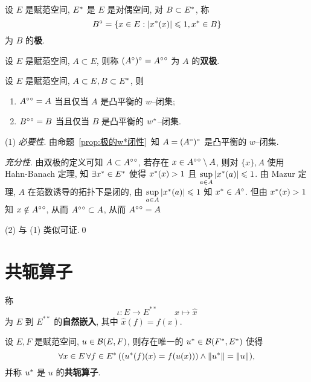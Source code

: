 	\begin{Definition}[对偶空间的极]\label{def:对偶空间的极}
		设 $ E $ 是赋范空间, $ E^{*} $ 是 $ E $ 是对偶空间, 对 $ B\subset E^{*} $, 称
		\[
			B^{\circ}=\{ x\in E:\left| x^{*}(x) \right| \leqslant1, x^{*}\in B \}
		\]
		为 $ B $ 的\textbf{极}.
	\end{Definition}
	\begin{Definition}[双极]\label{def:双极}
		设 $ E $ 是赋范空间, $ A\subset E $, 则称 $ (A^{\circ})^{\circ}=A^{\circ}{}^{\circ} $ 为 $ A $ 的\textbf{双极}.
	\end{Definition}

	\begin{Theorem}[双极定理]\label{thm:双极定理}
		设 $ E $ 是赋范空间, $ A\subset E, B\subset E^{*} $, 则
		\begin{enumerate}[(1)]
			\item $ A^{\circ}{}^{\circ}=A $ 当且仅当 $ A $ 是凸平衡的 $ w $--闭集;
			\item $ B^{\circ}{}^{\circ}=B $ 当且仅当 $ B $ 是凸平衡的 $ w^{*} $--闭集.
		\end{enumerate}
	\end{Theorem}
	\begin{Proof}
		(1) \textsl{必要性}. 由命题~\ref{prop:极的w*闭性}~知 $ A=(A^{\circ})^{\circ} $ 是凸平衡的 $ w $--闭集.

		\textsl{充分性}. 由双极的定义可知 $ A\subset A^{\circ}{}^{\circ} $, 若存在 $ x\in A^{\circ}{}^{\circ}\setminus A $, 则对 $ \{ x \}, A $ 使用 Hahn-Banach 定理, 知 $ \exists x^{*}\in E^{*} $ 使得 $ x^{*}(x)>1 $ 且 $ \sup\limits_{a\in A}\left| x^{*}(a) \right| \leqslant1 $. 由 Mazur 定理,  $ A $ 在范数诱导的拓扑下是闭的, 由 $ \sup\limits_{a\in A}\left| x^{*}(a) \right| \leqslant1 $ 知 $ x^{*}\in A^{\circ} $. 但由 $ x^{*}(x)>1 $ 知 $ x\notin A^{\circ}{}^{\circ} $, 从而 $ A^{\circ}{}^{\circ}\subset A $, 从而 $ A^{\circ}{}^{\circ}= A $

		(2) 与 (1) 类似可证.\qed
	\end{Proof}

\section{共轭算子}
	\begin{Definition}[自然嵌入]\label{def:自然嵌入}
		称
		\[
			\iota: E\to E^{**}\qquad x\mapsto \hat{x}
		\]
		为 $ E $ 到 $ E^{**} $ 的\textbf{自然嵌入}, 其中 $ \hat{x}(f)=f(x) $.
	\end{Definition}
	\begin{Theorem}
		设 $ E, F $ 是赋范空间,  $ u\in\mathcal{B}(E, F) $, 则存在唯一的 $ u^{*}\in\mathcal{B}(F^{*}, E^{*}) $ 使得
		\[
			\forall x\in E\,\forall f\in E^{*}\,((u^{*}(f)(x)=f(u(x)))\land \left\| u^{*} \right\|=\left\| u \right\|),
		\]
		并称 $ u^{*} $ 是 $ u $ 的\textbf{共轭算子}.
	\end{Theorem}

